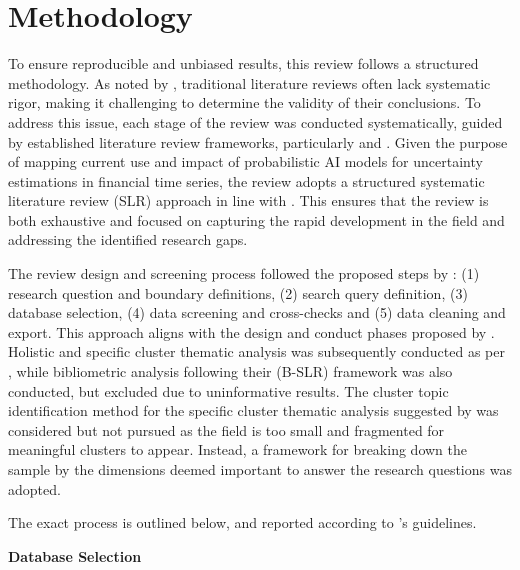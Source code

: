 \section{Methodology}
\label{sec:methodology}

To ensure reproducible and unbiased results, this review follows a structured methodology. As noted by \textcite{tranfield_et_al}, traditional literature reviews often lack systematic rigor, making it challenging to determine the validity of their conclusions. To address this issue, each stage of the review was conducted systematically, guided by established literature review frameworks, particularly \textcite{snyder_2019} and \textcite{marzi_et_al_2024}. Given the purpose of mapping current use and impact of probabilistic AI models for uncertainty estimations in financial time series, the review adopts a structured systematic literature review (SLR) approach in line with \textcite{snyder_2019}. This ensures that the review is both exhaustive and focused on capturing the rapid development in the field and addressing the identified research gaps. 

The review design and screening process followed the proposed steps by \textcite{marzi_et_al_2024}: (1) research question and boundary definitions, (2) search query definition, (3) database selection, (4) data screening and cross-checks and (5) data cleaning and export. This approach aligns with the design and conduct phases proposed by \textcite{snyder_2019}. Holistic and specific cluster thematic analysis was subsequently conducted as per \textcite{marzi_et_al_2024}, while bibliometric analysis following their (B-SLR) framework was also conducted, but excluded due to uninformative results. The cluster topic identification method for the specific cluster thematic analysis suggested by \cite{marzi_et_al_2024} was considered but not pursued as the field is too small and fragmented for meaningful clusters to appear. Instead, a framework for breaking down the sample by the dimensions deemed important to answer the research questions was adopted. 

The exact process is outlined below, and reported according to \textcite{marzi_et_al_2024}'s guidelines.

\textbf{Database Selection}\nopagebreak

